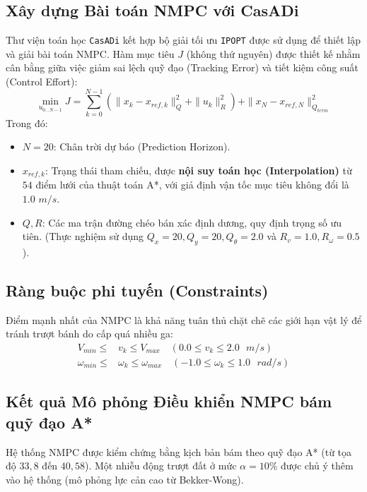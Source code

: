 \documentclass[12pt, a4paper]{article}
\begin{document}
\subsection{Xây dựng Bài toán NMPC với CasADi}
Thư viện toán học \texttt{CasADi} \cite{andersson2019} kết hợp bộ giải tối ưu \texttt{IPOPT} \cite{wachter2006} được sử dụng để thiết lập và giải bài toán NMPC. Hàm mục tiêu $J$ (không thứ nguyên) được thiết kế nhằm cân bằng giữa việc giảm sai lệch quỹ đạo (Tracking Error) và tiết kiệm công suất (Control Effort):
\begin{equation}
    \min_{u_{0 \dots N-1}} J = \sum_{k=0}^{N-1} \left( \|x_k - x_{ref,k}\|_Q^2 + \|u_k\|_R^2 \right) + \|x_N - x_{ref,N}\|_{Q_{term}}^2
\end{equation}
Trong đó:
\begin{itemize}
    \item $N = 20$: Chân trời dự báo (Prediction Horizon).
    \item $x_{ref,k}$: Trạng thái tham chiếu, được \textbf{nội suy toán học (Interpolation)} từ $54$ điểm lưới của thuật toán A*, với giả định vận tốc mục tiêu không đổi là $1.0$ $m/s$.
    \item $Q, R$: Các ma trận đường chéo bán xác định dương, quy định trọng số ưu tiên. (Thực nghiệm sử dụng $Q_x=20, Q_y=20, Q_\theta=2.0$ và $R_v=1.0, R_\omega=0.5$).
\end{itemize}

\subsection{Ràng buộc phi tuyến (Constraints)}
Điểm mạnh nhất của NMPC là khả năng tuân thủ chặt chẽ các giới hạn vật lý để tránh trượt bánh do cấp quá nhiều ga:
\begin{align}
    V_{min} \leq &v_k \leq V_{max} \quad (0.0 \leq v_k \leq 2.0 \text{ } m/s) \\
    \omega_{min} \leq &\omega_k \leq \omega_{max} \quad (-1.0 \leq \omega_k \leq 1.0 \text{ } rad/s)
\end{align}

\subsection{Kết quả Mô phỏng Điều khiển NMPC bám quỹ đạo A*}
Hệ thống NMPC được kiểm chứng bằng kịch bản bám theo quỹ đạo A* (từ tọa độ $33, 8$ đến $40, 58$). Một nhiễu động trượt đất ở mức $\alpha = 10\%$ được chủ ý thêm vào hệ thống (mô phỏng lực cản cao từ Bekker-Wong).
\end{document}
